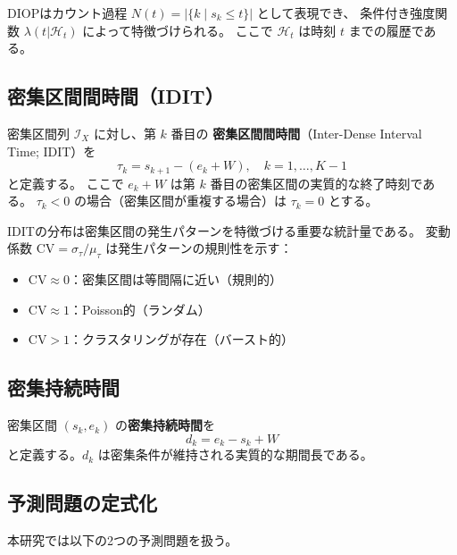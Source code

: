 DIOPはカウント過程 $N(t) = |\{k \mid s_k \leq t\}|$ として表現でき、
条件付き強度関数 $\lambda(t|\mathcal{H}_t)$ によって特徴づけられる。
ここで $\mathcal{H}_t$ は時刻 $t$ までの履歴である。

\subsection{密集区間間時間（IDIT）}

\begin{definition}[密集区間間時間]
  密集区間列 $\mathcal{I}_X$ に対し、第 $k$ 番目の
  \textbf{密集区間間時間}（Inter-Dense Interval Time; IDIT）を
  \begin{equation}
    \tau_k = s_{k+1} - (e_k + W), \quad k = 1, \ldots, K-1
  \end{equation}
  と定義する。
  ここで $e_k + W$ は第 $k$ 番目の密集区間の実質的な終了時刻である。
  $\tau_k < 0$ の場合（密集区間が重複する場合）は $\tau_k = 0$ とする。
\end{definition}

IDITの分布は密集区間の発生パターンを特徴づける重要な統計量である。
変動係数 $\mathrm{CV} = \sigma_\tau / \mu_\tau$ は発生パターンの規則性を示す：
\begin{itemize}
  \item $\mathrm{CV} \approx 0$：密集区間は等間隔に近い（規則的）
  \item $\mathrm{CV} \approx 1$：Poisson的（ランダム）
  \item $\mathrm{CV} > 1$：クラスタリングが存在（バースト的）
\end{itemize}

\subsection{密集持続時間}

\begin{definition}[密集持続時間]
  密集区間 $(s_k, e_k)$ の\textbf{密集持続時間}を
  \begin{equation}
    d_k = e_k - s_k + W
  \end{equation}
  と定義する。$d_k$ は密集条件が維持される実質的な期間長である。
\end{definition}

\subsection{予測問題の定式化}

本研究では以下の2つの予測問題を扱う。

